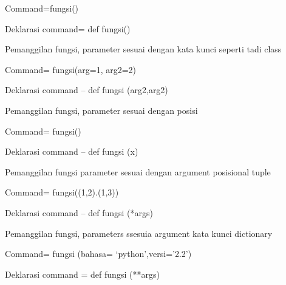 {{{{{{{{\noindent 
{\fontsize{14pt}{14pt}\selectfont Command=fungsi() \\} \par
\noindent 
{\fontsize{14pt}{14pt}\selectfont Deklarasi command= def fungsi() \\} \par
\vspace{14pt}
\noindent 
{\fontsize{14pt}{14pt}\selectfont Pemanggilan fungsi, parameter sesuai dengan kata kunci seperti tadi class \\} \par
\noindent 
{\fontsize{14pt}{14pt}\selectfont Command= fungsi(arg=1, arg2=2) \\} \par
\noindent 
{\fontsize{14pt}{14pt}\selectfont Deklarasi command – def fungsi (arg2,arg2) \\} \par
\vspace{14pt}
\noindent 
{\fontsize{14pt}{14pt}\selectfont Pemanggilan fungsi, parameter sesuai dengan posisi \\} \par
\noindent 
{\fontsize{14pt}{14pt}\selectfont Command= fungsi() \\} \par
\noindent 
{\fontsize{14pt}{14pt}\selectfont Deklarasi command – def fungsi (x) \\} \par
\vspace{14pt}
\noindent 
{\fontsize{14pt}{14pt}\selectfont Pemanggilan fungsi parameter sesuai dengan argument posisional tuple \\} \par
\noindent 
{\fontsize{14pt}{14pt}\selectfont Command= fungsi((1,2).(1,3)) \\} \par
\noindent 
{\fontsize{14pt}{14pt}\selectfont Deklarasi command – def fungsi (*args) \\} \par
\vspace{14pt}
\noindent 
{\fontsize{14pt}{14pt}\selectfont Pemanggilan fungsi, parameters ssesuia argument kata kunci dictionary \\} \par
\noindent 
{\fontsize{14pt}{14pt}\selectfont Command= fungsi (bahasa= ‘python’,versi=’2.2’) \\} \par
\noindent 
{\fontsize{14pt}{14pt}\selectfont Deklarasi command = def fungsi (**args) \\} \par
}}}}}}}}
